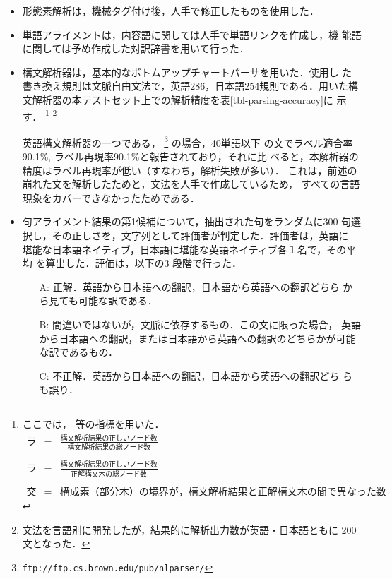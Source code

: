 \begin{itemize}

\item 形態素解析は，機械タグ付け後，人手で修正したものを使用した．

\item 単語アライメントは，内容語に関しては人手で単語リンクを作成し，機
能語に関しては予め作成した対訳辞書を用いて行った．

\item 構文解析器は，基本的なボトムアップチャートパーサを用いた．使用し
た書き換え規則は文脈自由文法で，英語286，日本語254規則である．用いた構
文解析器の本テストセット上での解析精度を表\ref{tbl-parsing-accuracy}に
示す．
\footnote{
ここでは，
等の指標を用いた．
\begin{eqnarray*}
\mbox{ラベル適合率} &
 = & 
 \frac{\mbox{構文解析結果の正しいノード数}}{\mbox{構文解析結果の総ノード数}} \\
\\
\mbox{ラベル再現率} &
 = & 
 \frac{\mbox{構文解析結果の正しいノード数}}{\mbox{正解構文木の総ノード数}} \\
\\
\mbox{交差括弧数} &
 = &
 構成素（部分木）の境界が，構文解析結果と正解構文木の間で異なった数
\end{eqnarray*}
\vspace*{-10pt}
}
\footnote{文法を言語別に開発したが，結果的に解析出力数が英語・日本語ともに
200文となった．}

英語構文解析器の一つである，
\footnote{\tt ftp://ftp.cs.brown.edu/pub/nlparser/} の場合，40単語以下
の文でラベル適合率90.1\%, ラベル再現率90.1\%と報告されており，それに比
べると，本解析器の精度はラベル再現率が低い（すなわち，解析失敗が多い）．
これは，前述の崩れた文を解析したためと，文法を人手で作成しているため，
すべての言語現象をカバーできなかったためである．


\item 句アライメント結果の第1候補について，抽出された句をランダムに300
句選択し，その正しさを，文字列として評価者が判定した．評価者は，英語に
堪能な日本語ネイティブ，日本語に堪能な英語ネイティブ各１名で，その平均
を算出した．評価は，以下の3 段階で行った．
  \begin{itemize}\itemsep=0mm
  \item[A:] 正解．英語から日本語への翻訳，日本語から英語への翻訳どちら
  から見ても可能な訳である．
  \item[B:] 間違いではないが，文脈に依存するもの．この文に限った場合，
  英語から日本語への翻訳，または日本語から英語への翻訳のどちらかが可能
  な訳であるもの．
  \item[C:] 不正解．英語から日本語への翻訳，日本語から英語への翻訳どち
  らも誤り．
  \end{itemize}
\end{itemize}

